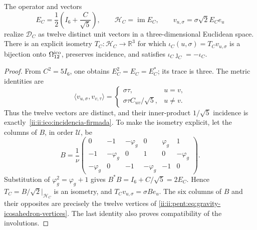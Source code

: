 \begin{proposition}
\label{ii:ii:ico:realizacion-firmada}
The operator and vectors
\begin{equation}
 E_C=\frac12\left(I_6+\frac C{\sqrt5}\right),\qquad
 \mathcal H_C=\operatorname{im}E_C,\qquad
 v_{u,\sigma}=\sigma\sqrt2 E_Ce_u
 \label{ii:ii:ico:proyector-seis}
\end{equation}
realize \(\mathcal D_C\) as twelve distinct unit vectors in a
three-dimensional Euclidean space. There is an explicit isometry
\(T_C:\mathcal H_C\to\mathbb R^3\) for which
\(\iota_C(u,\sigma)=T_Cv_{u,\sigma}\) is a bijection onto
\(\Omega_{12}^{\rm ico}\), preserves incidence, and satisfies
\(\iota_C\jmath_C=-\iota_C\).
\end{proposition}
\begin{proof}
From \(C^2=5I_6\), one obtains \(E_C^2=E_C=E_C^*\); its trace is three.
The metric identities are
\[
 \langle v_{u,\sigma},v_{v,\tau}\rangle
 =\begin{cases}\sigma\tau,&u=v,\\
 \sigma\tau C_{uv}/\sqrt5,&u\ne v.
 \end{cases}
\]
Thus the twelve vectors are distinct, and their inner-product
\(1/\sqrt5\) incidence is exactly~\eqref{ii:ii:ico:incidencia-firmada}.
To make the isometry explicit, let the columns of \(B\), in order
\(\mathcal U\), be
\[
 B=\frac1\nu
 \begin{pmatrix}
 0&-1&-\varphi_g&0&\varphi_g&1\\
 -1&-\varphi_g&0&1&0&-\varphi_g\\
 -\varphi_g&0&-1&-\varphi_g&-1&0
 \end{pmatrix}.
\]
Substitution of \(\varphi_g^2=\varphi_g+1\) gives
\(B^*B=I_6+C/\sqrt5=2E_C\). Hence
\(T_C=B/\sqrt2\big|_{\mathcal H_C}\) is an isometry, and
\(T_Cv_{u,\sigma}=\sigma Be_u\). The six columns of \(B\) and their
opposites are precisely the twelve vertices of
\eqref{ii:ii:pent:eq:gravity-icosahedron-vertices}. The last identity
also proves compatibility of the involutions.
\end{proof}


